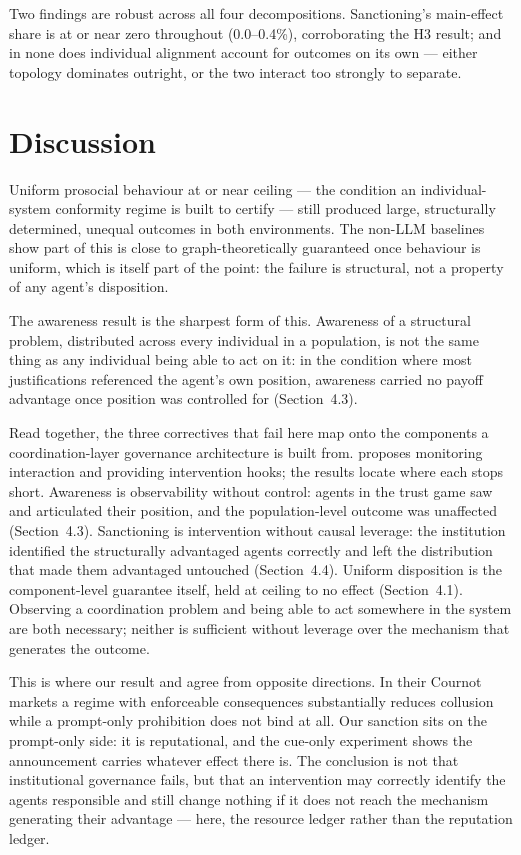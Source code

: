 \documentclass[11pt,a4paper]{article}
\begin{document}
Two findings are robust across all four decompositions. Sanctioning's
main-effect share is at or near zero throughout (0.0--0.4\%),
corroborating the H3 result; and in none does individual alignment
account for outcomes on its own --- either topology dominates
outright, or the two interact too strongly to separate.

\section{Discussion}

Uniform prosocial behaviour at or near ceiling --- the condition an
individual-system conformity regime is built to certify --- still
produced large, structurally determined, unequal outcomes in both
environments. The non-LLM baselines show part of this is close to
graph-theoretically guaranteed once behaviour is uniform, which is
itself part of the point: the failure is structural, not a property of
any agent's disposition.

The awareness result is the sharpest form of this. Awareness of a
structural problem, distributed across every individual in a
population, is not the same thing as any individual being able to act
on it: in the condition where most justifications referenced
the agent's own position, awareness carried no payoff advantage once
position was controlled for (Section~4.3).

Read together, the three correctives that fail here map onto the
components a coordination-layer governance architecture is built
from. \citet{Bohr:2026:Coordination} proposes monitoring interaction and providing
intervention hooks; the results locate where each stops short.
Awareness is observability without control: agents in the trust game
saw and articulated their position, and the population-level outcome
was unaffected (Section~4.3). Sanctioning is intervention without
causal leverage: the institution identified the structurally
advantaged agents correctly and left the distribution that made them
advantaged untouched (Section~4.4). Uniform disposition is the
component-level guarantee itself, held at ceiling to no effect
(Section~4.1). Observing a coordination problem and being able to act
somewhere in the system are both necessary; neither is sufficient
without leverage over the mechanism that generates the outcome.

This is where our result and \citet{BracaleSyrnikov:2026:Collusion} agree from
opposite directions. In their Cournot markets a regime with
enforceable consequences substantially reduces collusion while a
prompt-only prohibition does not bind at all. Our sanction sits on the
prompt-only side: it is reputational, and the cue-only experiment
shows the announcement carries whatever effect there is. The
conclusion is not that institutional governance fails, but that an
intervention may correctly identify the agents responsible and still
change nothing if it does not reach the mechanism generating their
advantage --- here, the resource ledger rather than the reputation
ledger.
\end{document}
